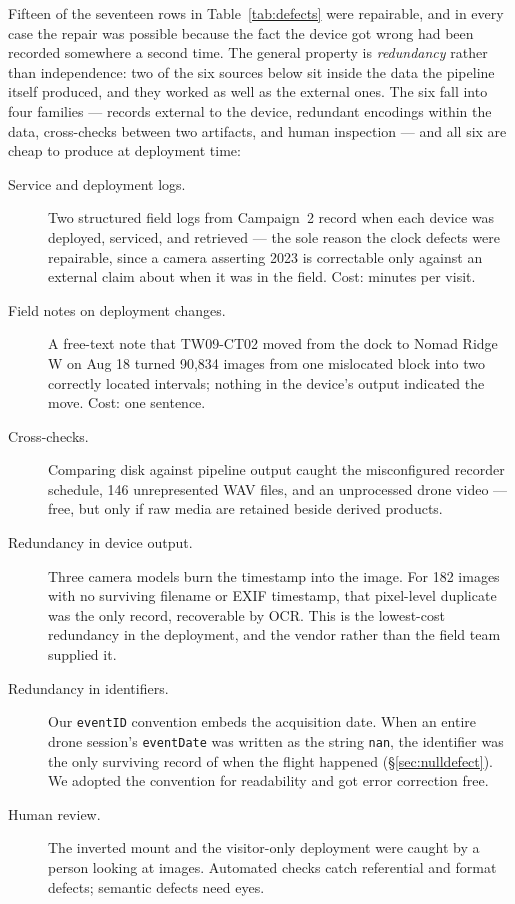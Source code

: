 \documentclass[sigconf]{acmart}
\begin{document}
Fifteen of the seventeen rows in Table~\ref{tab:defects} were
repairable, and in every case the repair was possible because the fact
the device got wrong had been recorded somewhere a second time. The
general property is \emph{redundancy} rather than independence: two of
the six sources below sit inside the data the pipeline itself produced,
and they worked as well as the external ones. The six fall into four
families --- records external to the device, redundant encodings within
the data, cross-checks between two artifacts, and human inspection ---
and all six are cheap to produce at deployment time:

\begin{description}
\item[Service and deployment logs.] Two structured field logs from
Campaign~2 record when each device was deployed, serviced, and
retrieved --- the sole reason the clock defects were repairable, since a
camera asserting 2023 is correctable only against an external claim
about when it was in the field. Cost: minutes per visit.

\item[Field notes on deployment changes.] A free-text note that
TW09-CT02 moved from the dock to Nomad Ridge W on Aug 18 turned
90{,}834 images from one mislocated block into two correctly located
intervals; nothing in the device's output indicated the move. Cost: one
sentence.

\item[Cross-checks.] Comparing disk against pipeline output caught the
misconfigured recorder schedule, 146 unrepresented WAV files, and an
unprocessed drone video --- free, but only if raw media are retained
beside derived products.

\item[Redundancy in device output.] Three camera models burn the
timestamp into the image. For 182 images with no surviving filename or
EXIF timestamp, that pixel-level duplicate was the only record,
recoverable by OCR. This is the lowest-cost redundancy in the
deployment, and the vendor rather than the field team supplied it.

\item[Redundancy in identifiers.] Our \texttt{eventID}
convention embeds the acquisition date. When an entire drone session's
\texttt{eventDate} was written as the string \texttt{nan}, the
identifier was the only surviving record of when the flight happened
(\S\ref{sec:nulldefect}). We adopted the convention for readability and
got error correction free.

\item[Human review.] The inverted mount and the visitor-only deployment
were caught by a person looking at images. Automated checks catch
referential and format defects; semantic defects need eyes.
\end{description}
\end{document}
